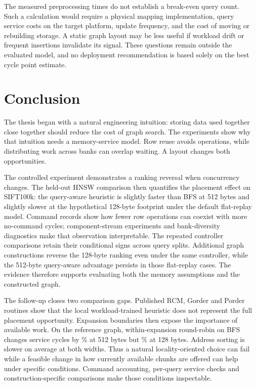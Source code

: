 \documentclass[11pt,a4paper]{report}
\begin{document}
The measured preprocessing times do not establish a break-even query count. Such a calculation would require a physical mapping implementation, query service costs on the target platform, update frequency, and the cost of moving or rebuilding storage. A static graph layout may be less useful if workload drift or frequent insertions invalidate its signal. These questions remain outside the evaluated model, and no deployment recommendation is based solely on the best cycle point estimate.

\chapter{Conclusion}
The thesis began with a natural engineering intuition: storing data used together close together should reduce the cost of graph search. The experiments show why that intuition needs a memory-service model. Row reuse avoids operations, while distributing work across banks can overlap waiting. A layout changes both opportunities.

The controlled experiment demonstrates a ranking reversal when concurrency changes. The held-out HNSW comparison then quantifies the placement effect on SIFT100k: the query-aware heuristic is slightly faster than BFS at 512 bytes and slightly slower at the hypothetical 128-byte footprint under the default flat-replay model. Command records show how fewer row operations can coexist with more no-command cycles; component-stream experiments and bank-diversity diagnostics make that observation interpretable. The repeated controller comparisons retain their conditional signs across query splits. Additional graph constructions reverse the 128-byte ranking even under the same controller, while the 512-byte query-aware advantage persists in those flat-replay cases. The evidence therefore supports evaluating both the memory assumptions and the constructed graph.

The follow-up closes two comparison gaps. Published RCM, Gorder and Porder routines show that the local workload-trained heuristic does not represent the full placement opportunity. Expansion boundaries then expose the importance of available work. On the reference graph, within-expansion round-robin on BFS changes service cycles by \RoundRobinBFSMeanFloat\% at 512 bytes but \RoundRobinBFSMeanCompact\% at 128 bytes. Address sorting is slower on average at both widths. Thus a natural locality-oriented choice can fail while a feasible change in how currently available chunks are offered can help under specific conditions. Command accounting, per-query service checks and construction-specific comparisons make those conditions inspectable.
\end{document}
